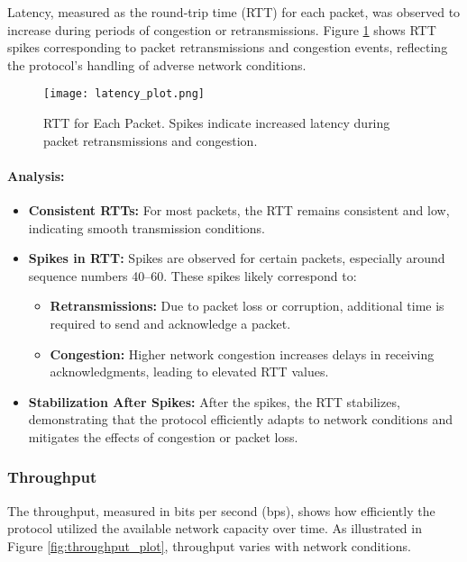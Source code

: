 \documentclass[11pt]{article}
\begin{document}
Latency, measured as the round-trip time (RTT) for each packet, was observed to increase during periods of congestion or retransmissions. Figure \ref{fig:latency_plot} shows RTT spikes corresponding to packet retransmissions and congestion events, reflecting the protocol's handling of adverse network conditions.

\begin{figure}[H]
    \centering
    \texttt{[image: latency\_plot.png]}
    \caption{RTT for Each Packet. Spikes indicate increased latency during packet retransmissions and congestion.}
    \label{fig:latency_plot}
\end{figure}

\paragraph{Analysis:}

\begin{itemize}
    \item \textbf{Consistent RTTs:} For most packets, the RTT remains consistent and low, indicating smooth transmission conditions.
    \item \textbf{Spikes in RTT:} Spikes are observed for certain packets, especially around sequence numbers 40–60. These spikes likely correspond to:
    \begin{itemize}
        \item \textbf{Retransmissions:} Due to packet loss or corruption, additional time is required to send and acknowledge a packet.
        \item \textbf{Congestion:} Higher network congestion increases delays in receiving acknowledgments, leading to elevated RTT values.
    \end{itemize}
    \item \textbf{Stabilization After Spikes:} After the spikes, the RTT stabilizes, demonstrating that the protocol efficiently adapts to network conditions and mitigates the effects of congestion or packet loss.
\end{itemize}

\subsubsection{Throughput}

The throughput, measured in bits per second (bps), shows how efficiently the protocol utilized the available network capacity over time. As illustrated in Figure \ref{fig:throughput_plot}, throughput varies with network conditions.
\end{document}
